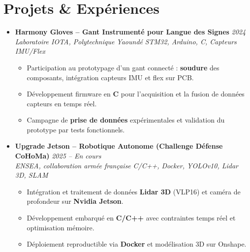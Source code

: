 \documentclass[a4paper,11pt]{article}
\begin{document}
\section{Projets \& Expériences}
\begin{itemize}[leftmargin=*, label={-}]

\item \textbf{Harmony Gloves -- Gant Instrumenté pour Langue des Signes} \hfill \textit{2024} \\
\textit{Laboratoire IOTA, Polytechnique Yaoundé} \hfill \textit{STM32, Arduino, C, Capteurs IMU/Flex}
\vspace{-2pt}
    \begin{itemize}[leftmargin=0.4cm, nosep, label=\tiny$\bullet$]
        \item \small{Participation au prototypage d'un gant connecté : \textbf{soudure} des composants, intégration capteurs IMU et flex sur PCB.}
        \item \small{Développement firmware en \textbf{C} pour l'acquisition et la fusion de données capteurs en temps réel.}
        \item \small{Campagne de \textbf{prise de données} expérimentales et validation du prototype par tests fonctionnels.}
    \end{itemize}
\vspace{3pt}

\item \textbf{Upgrade Jetson -- Robotique Autonome (Challenge Défense CoHoMa)} \hfill \textit{2025 -- En cours} \\
\textit{ENSEA, collaboration armée française} \hfill \textit{C/C++, Docker, YOLOv10, Lidar 3D, SLAM}
\vspace{-2pt}
    \begin{itemize}[leftmargin=0.4cm, nosep, label=\tiny$\bullet$]
        \item \small{Intégration et traitement de données \textbf{Lidar 3D} (VLP16) et caméra de profondeur sur \textbf{Nvidia Jetson}.}
        \item \small{Développement embarqué en \textbf{C/C++} avec contraintes temps réel et optimisation mémoire.}
        \item \small{Déploiement reproductible via \textbf{Docker} et modélisation 3D sur Onshape.}
    \end{itemize}
\vspace{3pt}


\end{itemize}
\end{document}
